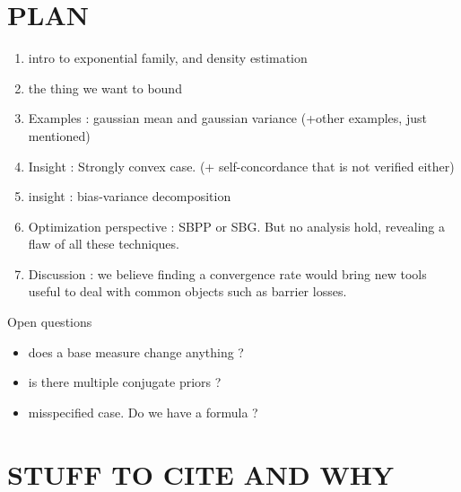\documentclass[twoside]{article}
\let\oldsection\section
\renewcommand{\section}[1]{\oldsection{\uppercase{#1}}}
\begin{document}






\clearpage
\section{Plan}

\begin{enumerate}
	\item intro to exponential family, and density estimation
	\item the thing we want to bound
	\item Examples : gaussian mean and gaussian variance (+other examples, just mentioned)
	\item Insight : Strongly convex case. (+ self-concordance that is not verified either)
	\item insight : bias-variance decomposition
	\item Optimization perspective : SBPP or SBG. But no analysis hold, revealing a flaw of all these techniques.
	\item Discussion : we believe finding a convergence rate would bring new tools useful to deal with common objects such as barrier losses.
\end{enumerate}

Open questions
\begin{itemize}
	\item does a base measure change anything ?
	\item is there multiple conjugate priors ?
	\item misspecified case. Do we have a   formula ?
\end{itemize}


\section{Stuff to cite and why }
\end{document}
